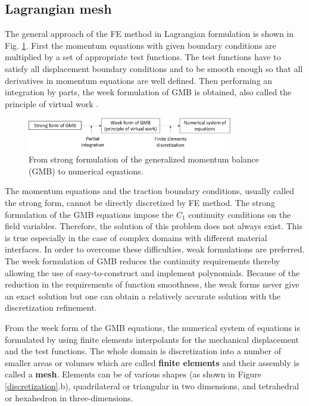 \subsection{Lagrangian mesh}\label{subsection:lagrangianmesh}

The general approach of the FE method in Lagrangian formulation is shown in Fig. \ref{fe_method}. First the momentum equations with given boundary conditions are multiplied by a set of appropriate test functions. The test functions have to satisfy all displacement boundary conditions and to be smooth enough so that all derivatives in momentum equations are well defined. Then performing an integration by parts, the week formulation of GMB is obtained, also called the principle of virtual work \citep{belytschko_nonlinear_2013}. 

\begin{figure}[!h]
\centering
\includegraphics[width=0.8\textwidth,keepaspectratio]{figures/fe_method.jpg}
\caption{From strong formulation of the generalized momentum balance (GMB) to numerical equations.}
\label{fe_method}
\end{figure}




 The momentum equations and the traction boundary conditions, usually called the strong form, cannot be directly discretized by FE method. The strong formulation of the GMB equations impose the $C_1$ continuity conditions on the field variables. Therefore, the solution of this problem does not always exist. This is true especially in the case of complex domains with different material interfaces. In order to overcome these difficulties, weak formulations are preferred. The week formulation of GMB reduces the continuity requirements thereby allowing the use of easy-to-construct and implement polynomials. Because of the reduction in the requirements of function smoothness, the weak forms never give an exact solution but one can obtain a relatively accurate solution with the discretization refinement.



From the week form of the GMB equations, the numerical system of equations is formulated by using finite elements interpolants for the mechanical displacement and the test functions.   The whole domain is discretization into a number of smaller areas or volumes which are called \textbf{finite elements} and their assembly is called a\textbf{ mesh}. Elements can be of various shapes (as shown in Figure \ref{discretization}.b),  quadrilateral or triangular in two dimensions, and tetrahedral or hexahedron in three-dimensions.



